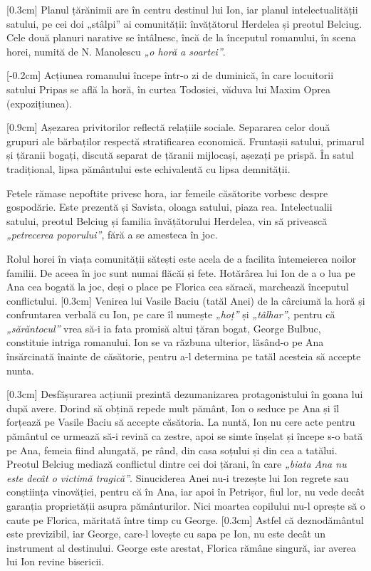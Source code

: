 [0.3cm]
Planul țărănimii are în centru destinul lui Ion, iar planul intelectualității satului, pe cei doi „stâlpi” ai comunității: învățătorul Herdelea și preotul Belciug. Cele două planuri narative se întâlnesc, încă de la începutul romanului, în scena horei, numită de N. Manolescu \textit{„o horă a soartei”}.

[-0.2cm]
Acțiunea romanului începe într-o zi de duminică, în care locuitorii satului Pripas se află la horă, în curtea Todosiei, văduva lui Maxim Oprea (expozițiunea).

[0.9cm]
Așezarea privitorilor reflectă relațiile sociale. Separarea celor două grupuri ale bărbaților respectă stratificarea economică. Fruntașii satului, primarul și țăranii bogați, discută separat de țăranii mijlocași, așezați pe prispă. În satul tradițional, lipsa pământului este echivalentă cu lipsa demnității.

Fetele rămase nepoftite privesc hora, iar femeile căsătorite vorbesc despre gospodărie. Este prezentă și Savista, oloaga satului, piaza rea. Intelectualii satului, preotul Belciug și familia învățătorului Herdelea, vin să privească \textit{„petrecerea poporului”}, fără a se amesteca în joc.

Rolul horei în viața comunității sătești este acela de a facilita întemeierea noilor familii. De aceea în joc sunt numai flăcăi și fete. Hotărârea lui Ion de a o lua pe Ana cea bogată la joc, deși o place pe Florica cea săracă, marchează începutul conflictului.
[0.3cm]
Venirea lui Vasile Baciu (tatăl Anei) de la cârciumă la horă și confruntarea verbală cu Ion, pe care îl numește \textit{„hoț”} și \textit{„tâlhar”}, pentru că \textit{„sărăntocul”} vrea să-i ia fata promisă altui țăran bogat, George Bulbuc, constituie intriga romanului. Ion se va răzbuna ulterior, lăsând-o pe Ana însărcinată înainte de căsătorie, pentru a-l determina pe tatăl acesteia să accepte nunta.

[0.3cm]
Desfășurarea acțiunii prezintă dezumanizarea protagonistului în goana lui după avere. Dorind să obțină repede mult pământ, Ion o seduce pe Ana și îl forțează pe Vasile Baciu să accepte căsătoria. La nuntă, Ion nu cere acte pentru pământul ce urmează să-i revină ca zestre, apoi se simte înșelat și începe s-o bată pe Ana, femeia fiind alungată, pe rând, din casa soțului și din cea a tatălui. Preotul Belciug mediază conflictul dintre cei doi țărani, în care \textit{„biata Ana nu este decât o victimă tragică”}. Sinuciderea Anei nu-i trezește lui Ion regrete sau conștiința vinovăției, pentru că în Ana, iar apoi în Petrișor, fiul lor, nu vede decât garanția  proprietății asupra pământurilor. Nici moartea copilului nu-l oprește să o caute pe Florica, măritată între timp cu George.
[0.3cm]
Astfel că deznodământul este previzibil, iar George, care-l lovește cu sapa pe Ion, nu este decât un instrument al destinului. George este arestat, Florica rămâne singură, iar averea lui Ion revine bisericii.


